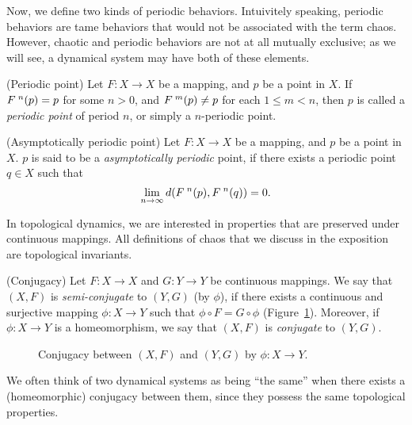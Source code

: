 \documentclass[10pt,twoside,draft]{book}
\begin{document}
Now, we define two kinds of periodic behaviors.
Intuivitely speaking, periodic behaviors are tame behaviors that would not be associated with the term chaos.
However, chaotic and periodic behaviors are not at all mutually exclusive; as we will see, a dynamical system may have both of these elements.
\begin{definition}
  (Periodic point)
  Let $F: X \to X$ be a mapping, and $p$ be a point in $X$.
  If $F^{\;n}(p) = p$ for some $n > 0$, and $F^{\;m}(p) \neq p$ for each $1 \leq m < n$, then $p$ is called a \textit{periodic point} of period $n$, or simply a $n$-periodic point.
  \label{def:porbit}
\end{definition}
\begin{definition}
  (Asymptotically periodic point)
  Let $F: X \to X$ be a mapping, and $p$ be a point in $X$.
  $p$ is said to be a \textit{asymptotically periodic} point, if there exists a periodic point $q \in X$ such that
  \begin{equation*}
    \lim\limits_{n \to \infty} d(F^{\;n}(p), F^{\;n}(q))
    = 0.
  \end{equation*}
\end{definition}
In topological dynamics, we are interested in properties that are preserved under continuous mappings.
All definitions of chaos that we discuss in the exposition are topological invariants.
\begin{definition}
  (Conjugacy)
  Let $F: X \to X$ and $G: Y \to Y$ be continuous mappings.
  We say that $(X,F)$ is \textit{semi-conjugate} to $(Y,G)$ (by $\phi$), if there exists a continuous and surjective mapping $\phi: X \to Y$ such that $\phi\circ F = G\circ\phi$ (Figure~\ref{fig:conj}).
  Moreover, if $\phi: X \to Y$ is a homeomorphism, we say that $(X,F)$ is \textit{conjugate} to $(Y,G)$.
\end{definition}
\begin{figure}[ht]
  \centering
  \caption{Conjugacy between $(X,F)$ and $(Y,G)$ by $\phi: X \to Y$.}
  \label{fig:conj}
\end{figure}
We often think of two dynamical systems as being ``the same'' when there exists a (homeomorphic) conjugacy between them, since they possess the same topological properties.




\printindex
\end{document}
